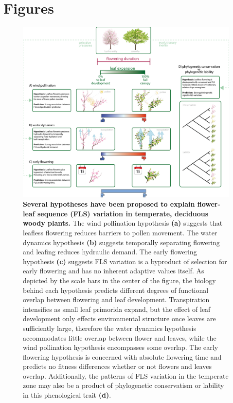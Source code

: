 \documentclass[12pt]{article}
\begin{document}
\section*{Figures}

\begin{figure}[h!]
    \centering
 \includegraphics[width=\textwidth]{..//HarvardForest/concept_hystheranty_wide_text_overlaps.png} 
    \caption{\textbf{Several hypotheses have been proposed to explain flower-leaf sequence (FLS) variation in temperate, deciduous woody plants.}  The wind pollination hypothesis \textbf{(a)} suggests that leafless flowering reduces barriers to pollen movement. The water dynamics hypothesis \textbf{(b)} suggests temporally separating flowering and leafing reduces hydraulic demand. The early flowering hypothesis \textbf{(c)} suggests FLS variation is a byproduct of selection for early flowering and has no inherent adaptive values itself. As depicted by the scale bars in the center of the figure, the biology behind each hypothesis predicts different degrees of functional overlap between flowering and leaf development. Transpiration intensifies as small leaf primorida expand, but the effect of leaf development only effects environmental structure once leaves are sufficiently large, therefore the water dynamics hypothesis accommodates little overlap between flower and leaves, while the wind pollination hypothesis encompasses some overlap. The early flowering hypothesis is concerned with absolute flowering time and predicts no fitness differences whether or not flowers and leaves overlap. Additionally, the patterns of FLS variation in the temperate zone may also be a product of phylogenetic conservatism or lability in this phenological trait \textbf{(d)}.}
    \label{fig:conceptual}
\end{figure}
\end{document}
